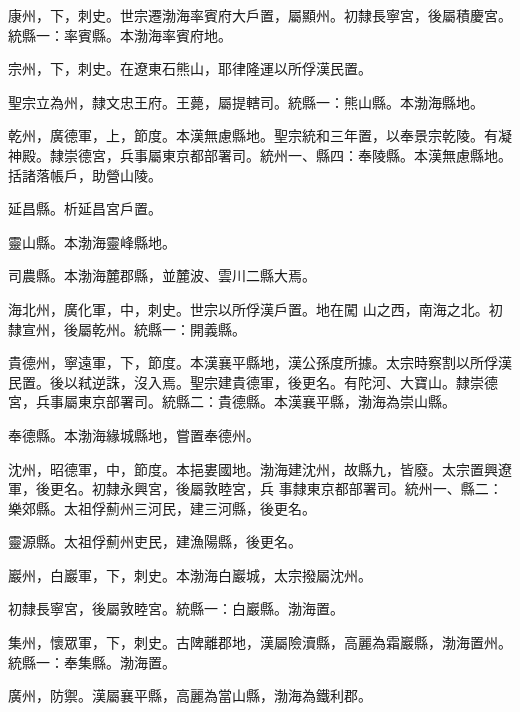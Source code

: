 \begin{pinyinscope}
 康州，下，刺史。世宗遷渤海率賓府大戶置，屬顯州。初隸長寧宮，後屬積慶宮。統縣一：率賓縣。本渤海率賓府地。



 宗州，下，刺史。在遼東石熊山，耶律隆運以所俘漢民置。



 聖宗立為州，隸文忠王府。王薨，屬提轄司。統縣一：熊山縣。本渤海縣地。



 乾州，廣德軍，上，節度。本漢無慮縣地。聖宗統和三年置，以奉景宗乾陵。有凝神殿。隸崇德宮，兵事屬東京都部署司。統州一、縣四：奉陵縣。本漢無慮縣地。括諸落帳戶，助營山陵。



 延昌縣。析延昌宮戶置。



 靈山縣。本渤海靈峰縣地。



 司農縣。本渤海麓郡縣，並麓波、雲川二縣大焉。



 海北州，廣化軍，中，刺史。世宗以所俘漢戶置。地在闖
 山之西，南海之北。初隸宣州，後屬乾州。統縣一：開義縣。



 貴德州，寧遠軍，下，節度。本漢襄平縣地，漢公孫度所據。太宗時察割以所俘漢民置。後以弒逆誅，沒入焉。聖宗建貴德軍，後更名。有陀河、大寶山。隸崇德宮，兵事屬東京部署司。統縣二：貴德縣。本漢襄平縣，渤海為崇山縣。



 奉德縣。本渤海緣城縣地，嘗置奉德州。



 沈州，昭德軍，中，節度。本挹婁國地。渤海建沈州，故縣九，皆廢。太宗置興遼軍，後更名。初隸永興宮，後屬敦睦宮，兵
 事隸東京都部署司。統州一、縣二：樂郊縣。太祖俘薊州三河民，建三河縣，後更名。



 靈源縣。太祖俘薊州吏民，建漁陽縣，後更名。



 巖州，白巖軍，下，刺史。本渤海白巖城，太宗撥屬沈州。



 初隸長寧宮，後屬敦睦宮。統縣一：白巖縣。渤海置。



 集州，懷眾軍，下，刺史。古陴離郡地，漢屬險瀆縣，高麗為霜巖縣，渤海置州。統縣一：奉集縣。渤海置。



 廣州，防禦。漢屬襄平縣，高麗為當山縣，渤海為鐵利郡。




\end{pinyinscope}
